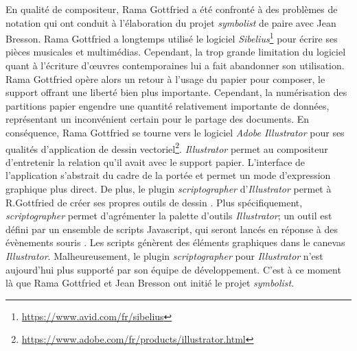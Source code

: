 En qualité de compositeur, Rama Gottfried a été confronté à des problèmes de notation qui ont conduit à l'élaboration du projet \textit{symbolist} de paire avec Jean Bresson.
Rama Gottfried a longtemps utilisé le logiciel \textit{Sibelius}\footnote{\url{https://www.avid.com/fr/sibelius}} pour écrire ses pièces musicales et multimédias. Cependant, la trop grande limitation du logiciel quant à l'écriture d'œuvres contemporaines lui a fait abandonner son utilisation. 
Rama Gottfried opère alors un retour à l'usage du papier pour composer, le support offrant une liberté bien plus importante. Cependant, la numérisation des partitions \og papier \fg engendre une quantité relativement importante de données, représentant un inconvénient certain pour le partage des documents.
En conséquence, Rama Gottfried se tourne vers le logiciel \textit{Adobe Illustrator} pour ses qualités d'application de dessin vectoriel\footnote{\url{https://www.adobe.com/fr/products/illustrator.html}}. \textit{Illustrator} permet au compositeur d'entretenir la relation qu'il avait avec le support papier. L'interface de l'application s'abstrait du cadre de la portée et permet un mode d'expression graphique plus direct. De plus, le plugin \textit{scriptographer} d'\textit{Illustrator} permet à R.Gottfried de créer ses propres outils de dessin \cite{scriptographer2018}. Plus spécifiquement, \textit{scriptographer} permet d'agrémenter la palette d'outils \textit{Illustrator}; un outil est défini par un ensemble de scripts Javascript, qui seront lancés en réponse à des évènements \og souris \fg. Les scripts génèrent des éléments graphiques dans le canevas \textit{Illustrator}. Malheureusement, le plugin \textit{scriptographer} pour \textit{Illustrator} n'est aujourd'hui plus supporté par son équipe de développement. C'est à ce moment là que Rama Gottfried et Jean Bresson ont initié le projet \textit{symbolist}.

